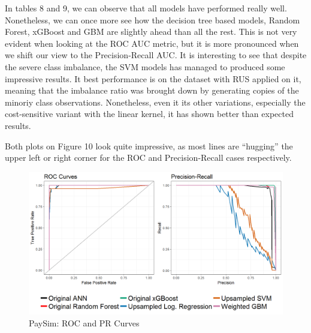 \documentclass[12pt,]{article}
\begin{document}
\begin{table}

\caption{\label{tab:paySim_model_PR}PaySim: PR Metric Model Variations}
\centering
{}
\end{table}

In tables 8 and 9, we can observe that all models have performed really
well. Nonetheless, we can once more see how the decision tree based
models, Random Forest, xGBoost and GBM are slightly ahead than all the
rest. This is not very evident when looking at the ROC AUC metric, but
it is more pronounced when we shift our view to the Precision-Recall
AUC. It is interesting to see that despite the severe class imbalance,
the SVM models has managed to produced some impressive results. It best
performance is on the dataset with RUS applied on it, meaning that the
imbalance ratio was brought down by generating copies of the minoriy
class observations. Nonetheless, even it its other variations,
especially the cost-sensitive variant with the linear kernel, it has
shown better than expected results.

Both plots on Figure 10 look quite impressive, as most lines are
``hugging'' the upper left or right corner for the ROC and
Precision-Recall cases respectively.

\begin{figure}
\centering
\includegraphics[width=1\textwidth,height=\textheight]{figures/paySim/paySim_pr_roc.png}
\caption{PaySim: ROC and PR Curves}
\end{figure}
\end{document}
